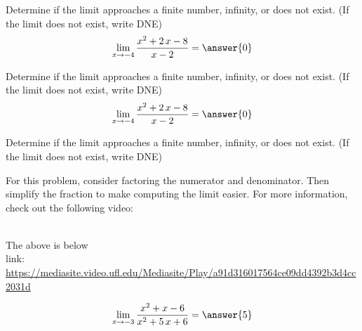 \documentclass[handout]{ximera}
\begin{document}
\begin{problem}
Determine if the limit approaches a finite number, infinity, or does not exist. (If the limit does not exist, write DNE)
\[\lim_{x\to{{-4}}}\dfrac{{{x^{2} + 2 \, x - 8}}}{{{x - 2}}}=\answer{0}\]
\end{problem}%



\begin{problem}
Determine if the limit approaches a finite number, infinity, or does not exist. (If the limit does not exist, write DNE)
\[\lim_{x\to{{-4}}}\dfrac{{{x^{2} + 2 \, x - 8}}}{{{x - 2}}}=\answer{0}\]
\end{problem}%



\begin{problem}
Determine if the limit approaches a finite number, infinity, or does not exist. (If the limit does not exist, write DNE)  \vspace{5pt}
\begin{hint}
For this problem, consider factoring the numerator and denominator.  Then simplify the fraction to make computing the limit easier.  For more information, check out the following video:
\end{hint}
\begin{hint}
\\
The above is below\\
{link: \url{https://mediasite.video.ufl.edu/Mediasite/Play/a91d316017564ce09dd4392b3d4cc2031d}}
\end{hint}


\[\lim_{x\to{{-3}}}\dfrac{{{x^{2} + x - 6}}}{{{x^{2} + 5 \, x + 6}}}=\answer{{{5}}}\]
\end{problem}%








\end{document}
